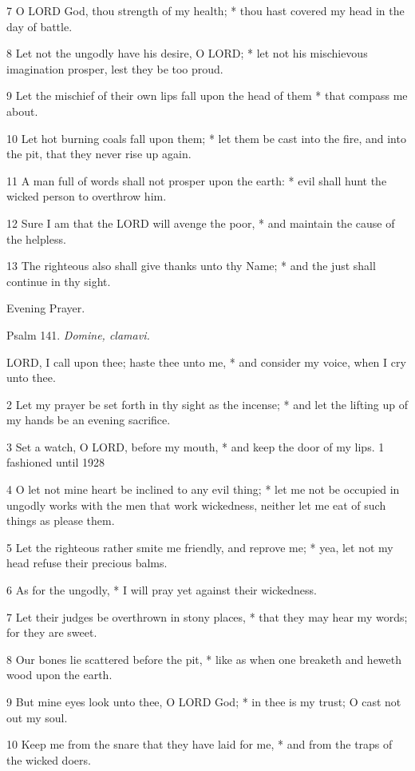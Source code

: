 7 O LORD God, thou strength of my health; * thou hast
covered my head in the day of battle.

8 Let not the ungodly have his desire, O LORD; * let
not his mischievous imagination prosper, lest they be too proud.

9 Let the mischief of their own lips fall upon the
head of them * that compass me about.

10 Let hot burning coals fall upon them; * let them
be cast into the fire, and into the pit, that they never rise up again.

11 A man full of words shall not prosper upon the earth:
* evil shall hunt the wicked person to overthrow him.

12 Sure I am that the LORD will avenge the poor, *
and maintain the cause of the helpless.

13 The righteous also shall give thanks unto thy Name;
* and the just shall continue in thy sight. 

Evening
Prayer.

Psalm
141. \emph{Domine, clamavi.}

LORD,
I call upon thee; haste thee unto me, * and consider my voice, when I
cry unto thee.

2 Let my prayer be set forth in thy sight as the incense;
* and let the lifting up of my hands be an evening sacrifice.

3 Set a watch, O LORD, before my mouth, * and keep
the door of my lips. 1 fashioned until
1928

4 O let not mine heart be inclined to any evil thing; * let me not be
occupied in ungodly works with the men that work wickedness, neither let
me eat of such things as please them.

5 Let the righteous rather smite me friendly, and reprove
me; * yea, let not my head refuse their precious balms.

6 As for the ungodly, * I will pray yet against their
wickedness.

7 Let their judges be overthrown in stony places, *
that they may hear my words; for they are sweet.

8 Our bones lie scattered before the pit, * like as
when one breaketh and heweth wood upon the earth.

9 But mine eyes look unto thee, O LORD God; * in thee
is my trust; O cast not out my soul.

10 Keep me from the snare that they have laid for me,
* and from the traps of the wicked doers.

